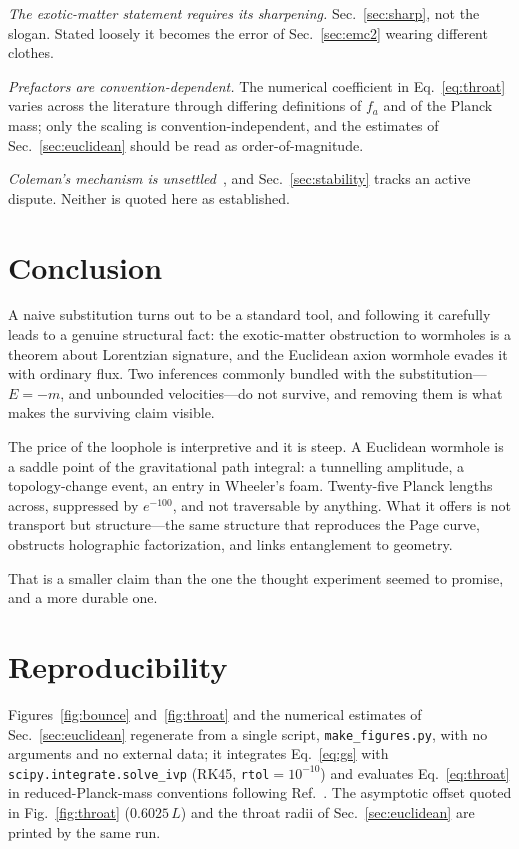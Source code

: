 \documentclass[twocolumn,floatfix,aps,prd,nofootinbib]{revtex4-2}
\begin{document}
\emph{The exotic-matter statement requires its sharpening.} Sec.~\ref{sec:sharp}, not the slogan. Stated loosely it becomes the error of Sec.~\ref{sec:emc2} wearing different clothes.

\emph{Prefactors are convention-dependent.} The numerical coefficient in Eq.~\eqref{eq:throat} varies across the literature through differing definitions of $f_a$ and of the Planck mass; only the scaling is convention-independent, and the estimates of Sec.~\ref{sec:euclidean} should be read as order-of-magnitude.

\emph{Coleman's mechanism is unsettled}~\cite{fischler1989,polchinski1989}, and Sec.~\ref{sec:stability} tracks an active dispute. Neither is quoted here as established.

\section{Conclusion}
\label{sec:conclusion}

A naive substitution turns out to be a standard tool, and following it carefully leads to a genuine structural fact: the exotic-matter obstruction to wormholes is a theorem about Lorentzian signature, and the Euclidean axion wormhole evades it with ordinary flux. Two inferences commonly bundled with the substitution---$E=-m$, and unbounded velocities---do not survive, and removing them is what makes the surviving claim visible.

The price of the loophole is interpretive and it is steep. A Euclidean wormhole is a saddle point of the gravitational path integral: a tunnelling amplitude, a topology-change event, an entry in Wheeler's foam. Twenty-five Planck lengths across, suppressed by $e^{-100}$, and not traversable by anything. What it offers is not transport but structure---the same structure that reproduces the Page curve, obstructs holographic factorization, and links entanglement to geometry.

That is a smaller claim than the one the thought experiment seemed to promise, and a more durable one.

\section*{Reproducibility}

Figures~\ref{fig:bounce} and~\ref{fig:throat} and the numerical estimates of Sec.~\ref{sec:euclidean} regenerate from a single script, \texttt{make\_figures.py}, with no arguments and no external data; it integrates Eq.~\eqref{eq:gs} with \texttt{scipy.integrate.solve\_ivp} (RK45, \texttt{rtol}${}=10^{-10}$) and evaluates Eq.~\eqref{eq:throat} in reduced-Planck-mass conventions following Ref.~\cite{alonso_urbano2019}. The asymptotic offset quoted in Fig.~\ref{fig:throat} ($0.6025\,L$) and the throat radii of Sec.~\ref{sec:euclidean} are printed by the same run.
\end{document}
